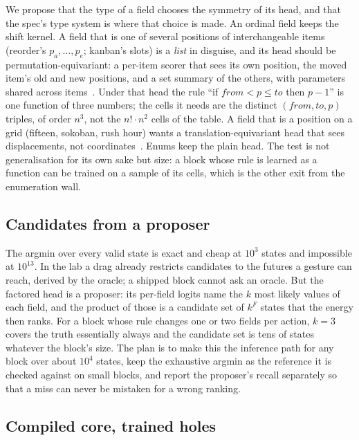 We propose that the type of a field chooses the symmetry of its head, and that the spec's type system is where
that choice is made. An ordinal field keeps the shift kernel. A field that is one of several positions of
interchangeable items (reorder's $p_a,\dots,p_e$; kanban's slots) is a \emph{list} in disguise, and its head
should be permutation-equivariant: a per-item scorer that sees its own position, the moved item's old and new
positions, and a set summary of the others, with parameters shared across items~\citep{zaheer2017deepsets,lee2019settransformer}.
Under that head the rule ``if $\mathit{from}<p\le\mathit{to}$ then $p-1$'' is one function of three numbers;
the cells it needs are the distinct $(\mathit{from},\mathit{to},p)$ triples, of order $n^3$, not the
$n!\cdot n^2$ cells of the table. A field that is a position on a grid (fifteen, sokoban, rush hour) wants a
translation-equivariant head that sees displacements, not coordinates~\citep{cohen2016gcnn}. Enums keep the
plain head. The test is not generalisation for its own sake but size: a block whose rule is learned as a
function can be trained on a sample of its cells, which is the other exit from the enumeration wall.

\subsection{Candidates from a proposer}
\label{sec:futures}

The argmin over every valid state is exact and cheap at $10^3$ states and impossible at $10^{13}$. In the lab a
drag already restricts candidates to the futures a gesture can reach, derived by the oracle; a shipped block
cannot ask an oracle. But the factored head is a proposer: its per-field logits name the $k$ most likely values
of each field, and the product of those is a candidate set of $k^F$ states that the energy then ranks. For a
block whose rule changes one or two fields per action, $k=3$ covers the truth essentially always and the
candidate set is tens of states whatever the block's size. The plan is to make this the inference path for any
block over about $10^4$ states, keep the exhaustive argmin as the reference it is checked against on small
blocks, and report the proposer's recall separately so that a miss can never be mistaken for a wrong ranking.

\subsection{Compiled core, trained holes}
\label{sec:compiled}

